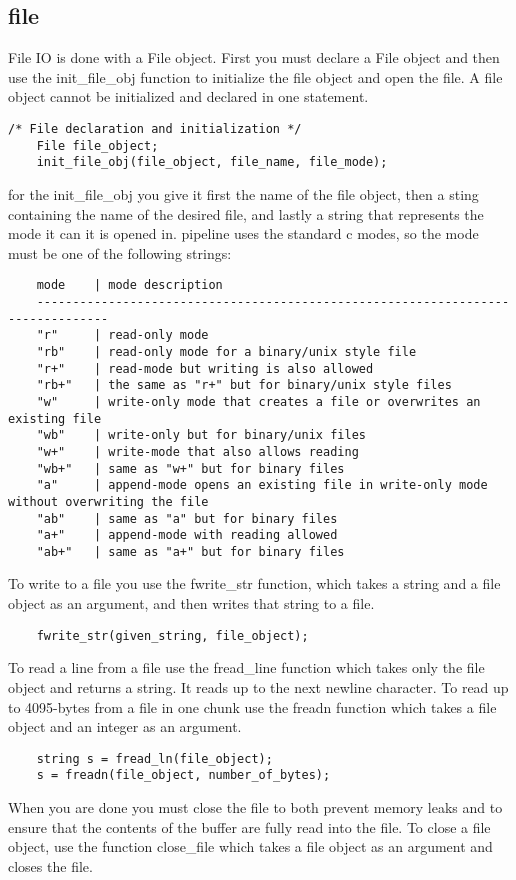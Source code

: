 \documentclass[./Report_main.tex]{subfiles}
\begin{document}
\subsection{file}
File IO is done with a File object. First you must declare a File object and then use the init_file_obj function to initialize the file object and open the file. A file object cannot be initialized and declared in one statement.
\begin{lstlisting}
/* File declaration and initialization */
	File file_object;
	init_file_obj(file_object, file_name, file_mode);
\end{lstlisting}
for the init_file_obj you give it first the name of the file object, then a sting containing the name of the desired file, and lastly a string that represents the mode it can it is opened in. pipeline uses the standard c modes, so the mode must be one of the following strings:
\begin{lstlisting}
	mode	| mode description
	--------------------------------------------------------------------------------
	"r" 	| read-only mode
	"rb"	| read-only mode for a binary/unix style file
	"r+"	| read-mode but writing is also allowed
	"rb+"	| the same as "r+" but for binary/unix style files
	"w"		| write-only mode that creates a file or overwrites an existing file
	"wb"	| write-only but for binary/unix files
	"w+"	| write-mode that also allows reading
	"wb+"	| same as "w+" but for binary files
	"a"		| append-mode opens an existing file in write-only mode without overwriting the file
	"ab"	| same as "a" but for binary files
	"a+"	| append-mode with reading allowed
	"ab+"	| same as "a+" but for binary files
\end{lstlisting}
To write to a file you use the fwrite_str function, which takes a string and a file object as an argument, and then writes that string to a file.
\begin{lstlisting}
	fwrite_str(given_string, file_object);
\end{lstlisting}
To read a line from a file use the fread_line function which takes only the file object and returns a string. It reads up to the next newline character. To read up to 4095-bytes from a file in one chunk use the freadn function which takes a file object and an integer as an argument.
\begin{lstlisting}
	string s = fread_ln(file_object);
	s = freadn(file_object, number_of_bytes);
\end{lstlisting}
When you are done you must close the file to both prevent memory leaks and to ensure that the contents of the buffer are fully read into the file. To close a file object, use the function close_file which takes a file object as an argument and closes the file.
\end{document}
